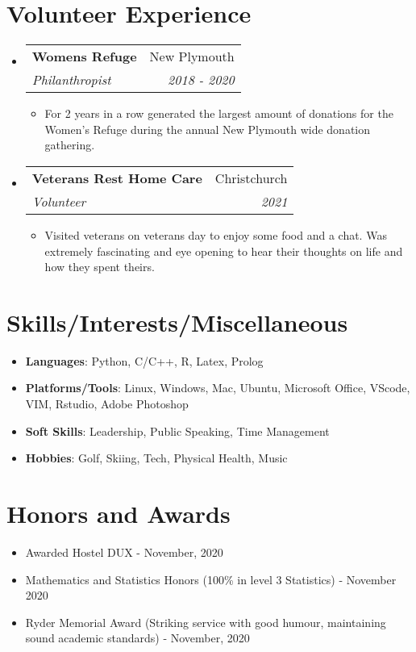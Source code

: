 \documentclass[a4paper,20pt]{article}
\makeatletter
\newcommand{\resumeItem}[2]{
  \item\small{
    \textbf{#1}{: #2 \vspace{-2pt}}
  }
}
\newcommand{\resumeSubheading}[4]{
  \vspace{-1pt}\item
    \begin{tabular*}{0.97\textwidth}{l@{\extracolsep{\fill}}r}
      \textbf{#1} & #2 \\
      \textit{#3} & \textit{#4} \\
    \end{tabular*}\vspace{-5pt}
}
\newcommand{\resumeSubItem}[2]{\resumeItem{#1}{#2}\vspace{-3pt}}
\newcommand{\resumeSubHeadingListStart}{\begin{itemize}[leftmargin=*]}
\newcommand{\resumeSubHeadingListEnd}{\end{itemize}}
\newcommand{\resumeItemListStart}{\begin{itemize}}
\newcommand{\resumeItemListEnd}{\end{itemize}\vspace{-5pt}}
\makeatother
\begin{document}
\section{Volunteer Experience}
  \resumeSubHeadingListStart
    \resumeSubheading{Womens Refuge}{New Plymouth}
    {Philanthropist}{2018 - 2020}
    \resumeItemListStart
        \item {For 2 years in a row generated the largest amount of donations for the Women's Refuge during the annual New Plymouth 
        wide donation gathering.}
      \resumeItemListEnd
\vspace{-1pt}
    \resumeSubheading
	{Veterans Rest Home Care}{Christchurch}
	{Volunteer}{2021}
		\resumeItemListStart
        \item {Visited veterans on veterans day to enjoy some food and a chat. Was extremely fascinating and eye opening to hear their 
        thoughts on life and how they spent theirs.}
      \resumeItemListEnd

\resumeSubHeadingListEnd


\vspace{-5pt}
\section{Skills/Interests/Miscellaneous}
\resumeSubHeadingListStart
	\resumeSubItem{Languages}{Python, C/C++, R, Latex, Prolog}
	\resumeSubItem{Platforms/Tools}{Linux, Windows, Mac, Ubuntu, Microsoft Office, VScode, VIM, Rstudio, Adobe Photoshop}
	\resumeSubItem{Soft Skills}{Leadership, Public Speaking, Time Management}
    \resumeSubItem{Hobbies}{Golf, Skiing, Tech, Physical Health, Music}
\resumeSubHeadingListEnd


\vspace{-2pt}
\section{Honors and Awards}
\resumeSubHeadingListStart
    \item {Awarded Hostel DUX - November, 2020}
    \vspace{-5pt}
    \item {Mathematics and Statistics Honors (100\% in level 3 Statistics) - November 2020}
    \vspace{-5pt}
    \item {Ryder Memorial Award (Striking service with good humour, maintaining sound academic standards) - November, 2020}
\resumeSubHeadingListEnd
\end{document}
